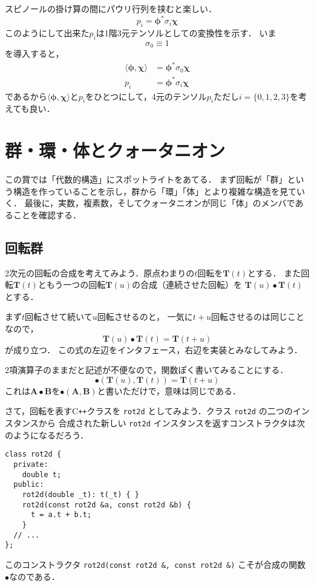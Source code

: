 \documentclass{jsbook}
\newcommand{\cxx}{\textrm{C}\texttt{++}}
\newcommand{\ccode}[1]{\texttt{#1}}
\newcommand{\bvec}[1]{\boldsymbol{#1}}
\newcommand{\bop}[1]{\boldsymbol{#1}}
\newcommand{\One}{1}%
\begin{document}
スピノールの掛け算の間にパウリ行列を挟むと楽しい．
\begin{equation}
p_i=\bvec{\phi}^*\sigma_i\bvec{\chi}
\end{equation}
このようにして出来た$p_i$は1階3元テンソルとしての変換性を示す．
いま
\begin{equation}
\sigma_0\equiv\One
\end{equation}
を導入すると，
\begin{align}
\langle\bvec{\phi},\bvec{\chi}\rangle&=\bvec{\phi}^*\sigma_0\bvec{\chi}\\
p_i&=\bvec{\phi}^*\sigma_i\bvec{\chi}
\end{align}
であるから$\langle\bvec{\phi},\bvec{\chi}\rangle$と$p_i$をひとつにして，4元のテンソル$p_i$ただし$i=\{0,1,2,3\}$を考えても良い．

\chapter{群・環・体とクォータニオン}

この賞では「代数的構造」にスポットライトをあてる．
まず回転が「群」という構造を作っていることを示し，群から「環」「体」とより複雑な構造を見ていく．
最後に，実数，複素数，そしてクォータニオンが同じ「体」のメンバであることを確認する．

\section{回転群}

2次元の回転の合成を考えてみよう．原点わまりの$t$回転を$\bop{T}(t)$とする．
また回転$\bop{T}(t)$ともう一つの回転$\bop{T}(u)$の合成（連続させた回転）を
$\bop{T}(u)\bullet\bop{T}(t)$とする．

まず$t$回転させて続いて$u$回転させるのと，
一気に$t+u$回転させるのは同じことなので，
\begin{equation}
\bop{T}(u)\bullet\bop{T}(t)=\bop{T}(t+u)
\end{equation}
が成り立つ．
この式の左辺をインタフェース，右辺を実装とみなしてみよう．

2項演算子のままだと記述が不便なので，関数ぽく書いてみることにする．
\begin{equation}
\bullet(\bop{T}(u),\bop{T}(t))=\bop{T}(t+u)
\end{equation}
これは$\bop{A}\bullet\bop{B}$を$\bullet(\bop{A},\bop{B})$と書いただけで，意味は同じである．

さて，回転を表す\cxx クラスを \ccode{rot2d} としてみよう．クラス \ccode{rot2d} の二つのインスタンスから
合成された新しい \ccode{rot2d} インスタンスを返すコンストラクタは次のようになるだろう．
\begin{verbatim}
class rot2d {
  private:
    double t;
  public:
    rot2d(double _t): t(_t) { }
    rot2d(const rot2d &a, const rot2d &b) {
      t = a.t + b.t;
    }
  // ...
};
\end{verbatim}
このコンストラクタ \ccode{rot2d(const rot2d \&, const rot2d \&)} こそが合成の関数$\bullet$なのである．
\end{document}
